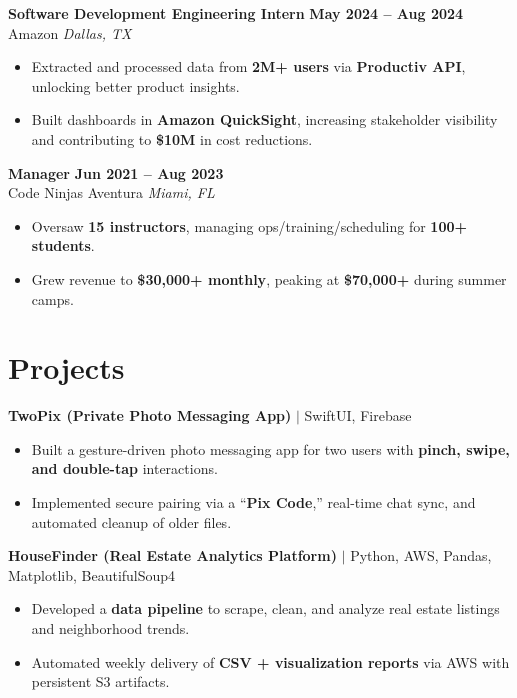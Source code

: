 \documentclass{resume}
\begin{document}
\textbf{Software Development Engineering Intern} \hfill \textbf{May 2024 – Aug 2024}\\
Amazon \hfill \textit{Dallas, TX}
\begin{itemize}
    \item Extracted and processed data from \textbf{2M+ users} via \textbf{Productiv API}, unlocking better product insights.
    \item Built dashboards in \textbf{Amazon QuickSight}, increasing stakeholder visibility and contributing to \textbf{\$10M} in cost reductions.
\end{itemize}

\textbf{Manager} \hfill \textbf{Jun 2021 – Aug 2023}\\
Code Ninjas Aventura \hfill \textit{Miami, FL}
\begin{itemize}
    \item Oversaw \textbf{15 instructors}, managing ops/training/scheduling for \textbf{100+ students}.
    \item Grew revenue to \textbf{\$30,000+ monthly}, peaking at \textbf{\$70,000+} during summer camps.
\end{itemize}

\section{Projects}

\textbf{TwoPix (Private Photo Messaging App)} $|$ SwiftUI, Firebase
\begin{itemize}
    \item Built a gesture-driven photo messaging app for two users with \textbf{pinch, swipe, and double-tap} interactions.
    \item Implemented secure pairing via a “\textbf{Pix Code},” real-time chat sync, and automated cleanup of older files.
\end{itemize}

\textbf{HouseFinder (Real Estate Analytics Platform)} $|$ Python, AWS, Pandas, Matplotlib, BeautifulSoup4
\begin{itemize}
    \item Developed a \textbf{data pipeline} to scrape, clean, and analyze real estate listings and neighborhood trends.
    \item Automated weekly delivery of \textbf{CSV + visualization reports} via AWS with persistent S3 artifacts.
\end{itemize}
\end{document}
